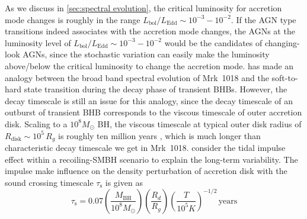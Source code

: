 \documentclass[twocolumn]{aastex63}
\begin{document}
As we discuss in \autoref{sec:spectral evolution}, the critical luminosity for accretion mode changes is roughly in the range $L_\mathrm{bol}/L_\mathrm{Edd}\sim10^{-3}-10^{-2}$. If the AGN type transitions indeed associates with the accretion mode changes, the AGNs at the luminosity level of $L_\mathrm{bol}/L_\mathrm{Edd}\sim10^{-3}-10^{-2}$ would be the candidates of changing-look AGNs, since the stochastic variation can easily make the luminosity above/below the critical luminosity to change the accretion mode. \citet{2018MNRAS.480.3898N} has made an analogy between the broad band spectral evolution of Mrk~1018 and the soft-to-hard state transition during the decay phase of transient BHBs. However, the decay timescale is still an issue for this analogy, since the decay timescale of an outburst of transient BHB corresponds to the viscous timescale of outer accretion disk. Scaling to a $10^{8}M_{\odot}$ BH, the viscous timescale at typical outer disk radius of $R_\mathrm{disk}\sim 10^5\, R_g$ is roughly ten million years \citep{2012MmSAI..83..469L,2018MNRAS.475.1190Y}, which is much longer than characteristic decay timescale we get in Mrk~1018.  \citet{2018ApJ...861...51K} consider the tidal impulse effect within a recoiling-SMBH scenario to explain the long-term variability. The impulse make influence on the density perturbation of accretion disk with the sound crossing timescale $\tau_\mathrm{s}$ is given as
\begin{equation}
\tau_\mathrm{s}= 0.07 (\frac{M_\mathrm{BH}}{10^8M_{\odot}})(\frac{R_d}{R_g}) (\frac{T}{10^5 K})^{-1/2} \, \mathrm{years}
\end{equation}
\end{document}
